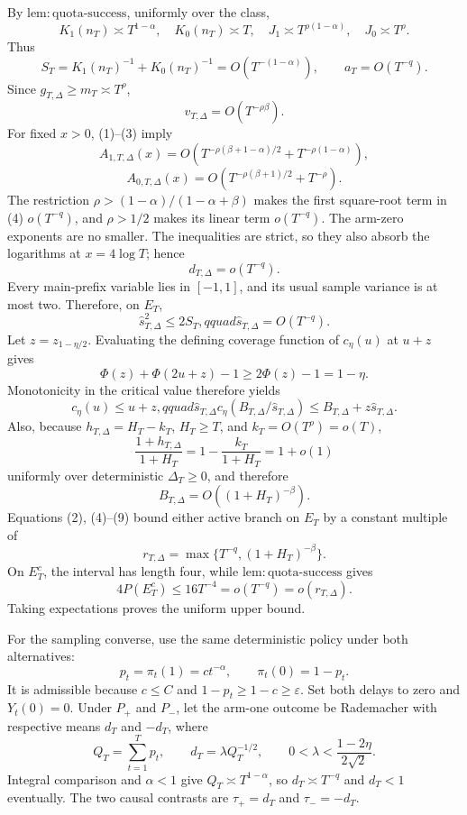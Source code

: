 By \(\mathrm{lem:quota\text{-}success}\), uniformly over the class,
\[
 K_1(n_T)\asymp T^{1-\alpha},\quad K_0(n_T)\asymp T,
 \quad J_1\asymp T^{\rho(1-\alpha)},\quad J_0\asymp T^\rho. \tag{1}
\]
Thus
\[
 S_T=K_1(n_T)^{-1}+K_0(n_T)^{-1}=O(T^{-(1-\alpha)}),
 \qquad a_T=O(T^{-q}). \tag{2}
\]
Since \(g_{T,\Delta}\geq m_T\asymp T^\rho\),
\[
 v_{T,\Delta}=O(T^{-\rho\beta}). \tag{3}
\]
For fixed \(x>0\), (1)--(3) imply
\[
 A_{1,T,\Delta}(x)=O\!\left(T^{-\rho(\beta+1-\alpha)/2}
 +T^{-\rho(1-\alpha)}\right), \tag{4}
\]
\[
 A_{0,T,\Delta}(x)=O\!\left(T^{-\rho(\beta+1)/2}+T^{-\rho}\right). \tag{5}
\]
The restriction \(\rho>(1-\alpha)/(1-\alpha+\beta)\) makes the first square-root term in (4) \(o(T^{-q})\), and \(\rho>1/2\) makes its linear term \(o(T^{-q})\).  The arm-zero exponents are no smaller.  The inequalities are strict, so they also absorb the logarithms at \(x=4\log T\); hence
\[
 d_{T,\Delta}=o(T^{-q}). \tag{6}
\]
Every main-prefix variable lies in \([-1,1]\), and its usual sample variance is at most two.  Therefore, on \(E_T\),
\[
 \widehat s_{T,\Delta}^2\leq2S_T,qquad
 \widehat s_{T,\Delta}=O(T^{-q}). \tag{7}
\]
Let \(z=z_{1-\eta/2}\).  Evaluating the defining coverage function of \(c_\eta(u)\) at \(u+z\) gives
\[
 \Phi(z)+\Phi(2u+z)-1\geq2\Phi(z)-1=1-\eta.
\]
Monotonicity in the critical value therefore yields
\[
 c_\eta(u)\leq u+z,qquad
 \widehat s_{T,\Delta}c_\eta(B_{T,\Delta}/\widehat s_{T,\Delta})
 \leq B_{T,\Delta}+z\widehat s_{T,\Delta}. \tag{8}
\]
Also, because \(h_{T,\Delta}=H_T-k_T\), \(H_T\geq T\), and \(k_T=O(T^\rho)=o(T)\),
\[
 \frac{1+h_{T,\Delta}}{1+H_T}=1-\frac{k_T}{1+H_T}=1+o(1)
\]
uniformly over deterministic \(\Delta_T\geq0\), and therefore
\[
 B_{T,\Delta}=O((1+H_T)^{-\beta}). \tag{9}
\]
Equations (2), (4)--(9) bound either active branch on \(E_T\) by a constant multiple of
\[
 r_{T,\Delta}=\max\{T^{-q},(1+H_T)^{-\beta}\}. \tag{10}
\]
On \(E_T^c\), the interval has length four, while \(\mathrm{lem:quota\text{-}success}\) gives
\[
 4P(E_T^c)\leq16T^{-4}=o(T^{-q})=o(r_{T,\Delta}). \tag{11}
\]
Taking expectations proves the uniform upper bound.

For the sampling converse, use the same deterministic policy under both alternatives:
\[
 p_t=\pi_t(1)=ct^{-\alpha},\qquad \pi_t(0)=1-p_t. \tag{12}
\]
It is admissible because \(c\leq C\) and \(1-p_t\geq1-c\geq\varepsilon\).  Set both delays to zero and \(Y_t(0)=0\).  Under \(P_+\) and \(P_-\), let the arm-one outcome be Rademacher with respective means \(d_T\) and \(-d_T\), where
\[
 Q_T=\sum_{t=1}^Tp_t,\qquad d_T=\lambda Q_T^{-1/2},
 \qquad 0<\lambda<\frac{1-2\eta}{2\sqrt2}. \tag{13}
\]
Integral comparison and \(\alpha<1\) give \(Q_T\asymp T^{1-\alpha}\), so \(d_T\asymp T^{-q}\) and \(d_T<1\) eventually.  The two causal contrasts are \(\tau_+=d_T\) and \(\tau_-=-d_T\).

